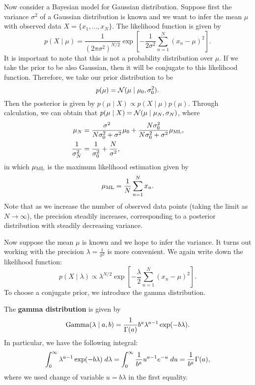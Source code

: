 \documentclass[a4paper]{article}
\begin{document}
Now consider a Bayesian model for Gaussian distribution.
Suppose first the variance $\sigma^2$ of a Gaussian
distribution is known and we 
want to infer the mean $\mu$ with observed data 
$X = \{x_1, \dots, x_N\}$. The likelihood function is 
given by 
\[
p(X \mid \mu) = \frac{1}{(2 \pi \sigma^2)^{N / 2}}
\exp \left[ - \frac{1}{2 \sigma^2} 
\sum_{n=1}^N (x_n - \mu)^2 \right].
\]
It is important to note that this is not a probability
distribution over $\mu$.
If we take the prior to be also Gaussian, then it will be 
conjugate to this likelihood function. Therefore, 
we take our prior distribution to be 
\[
p(\mu) = \mathcal{N}(\mu \mid \mu_0, \sigma_0^2).
\]
Then the posterior is given by $p(\mu \mid X) 
\propto p(X \mid \mu) p(\mu)$. Through calculation, 
we can obtain that $p(\mu \mid X) = \mathcal{N}(\mu \mid
\mu_N, \sigma_N)$, where 
\[
\begin{aligned}
  \mu_N &= \frac{\sigma^2}{N \sigma_0^2 + \sigma^2} 
  \mu_0 + \frac{N \sigma_0^2}{N \sigma_0^2 + \sigma^2} 
  \mu_{\text{ML}}, \\
  \frac{1}{\sigma_N^2} &= \frac{1}{\sigma_0^2} 
  + \frac{N}{\sigma^2},
\end{aligned}
\]
in which $\mu_{\text{ML}}$ is the maximum likelihood estimation 
given by 
\[
\mu_{\text{ML}} = \frac{1}{N} \sum_{n=1}^N x_n.
\]
Note that as we increase the number of observed data points (taking the 
limit as $N \to \infty$), the precision steadily increases, 
corresponding to a posterior distribution with steadily 
decreasing variance.

Now suppose the mean $\mu$ is known and we hope to infer 
the variance. It turns out working with the precision 
$\lambda = \frac{1}{\sigma^2}$ is more convenient. We 
again write down the likelihood function: 
\[
p(X \mid \lambda) 
\propto \lambda^{N / 2} 
\exp \left[ - \frac{\lambda}{2} \sum_{n=1}^N 
(x_n - \mu)^2 \right].
\]
To choose a conjugate prior, we introduce the 
gamma distribution.

\begin{defi}
The \textbf{gamma distribution} is given by 
\[
\operatorname{Gamma}(\lambda \mid a, b) = 
\frac{1}{\Gamma(a)} b^a \lambda^{a - 1} \exp (-b \lambda).
\]  
In particular, we have the following integral: 
\[
\begin{aligned}
\int_0^\infty \lambda^{a - 1} \exp(- b \lambda) \; d \lambda
= \int_0^\infty \frac{1}{b^a} u^{a - 1} e^{-u} \; d u 
= \frac{1}{b^a} \Gamma(a),
\end{aligned}
\]
where we used change of variable $u = b \lambda$
in the first equality.
\end{defi}
\end{document}
